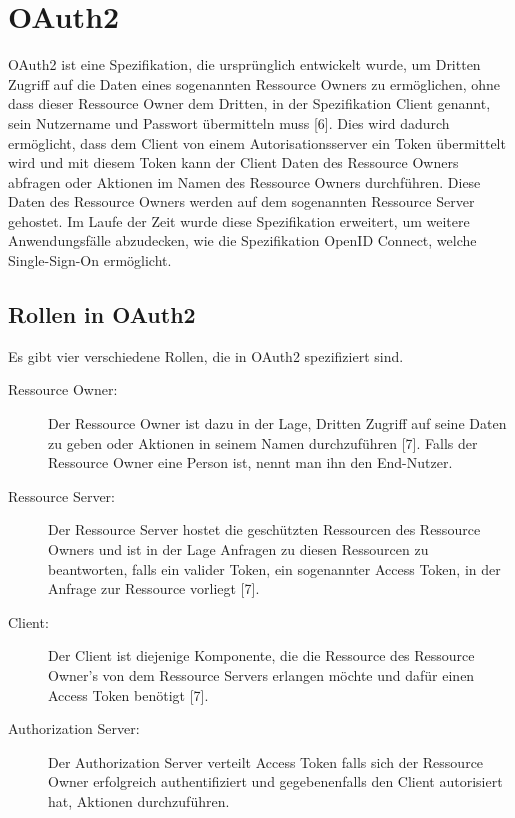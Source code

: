 %
%
\section{OAuth2}
\label{sec:background:second_section}
OAuth2 ist eine Spezifikation, die ursprünglich entwickelt wurde, um Dritten Zugriff auf die Daten eines sogenannten Ressource Owners zu ermöglichen, ohne dass dieser Ressource Owner dem Dritten, in der Spezifikation Client genannt, sein Nutzername und Passwort übermitteln muss [6].  Dies wird dadurch ermöglicht, dass dem Client von einem Autorisationsserver ein Token übermittelt wird und mit diesem Token kann der Client Daten des Ressource Owners abfragen oder Aktionen im Namen des Ressource Owners durchführen. Diese Daten des Ressource Owners werden auf dem sogenannten Ressource Server gehostet.
Im Laufe der Zeit wurde diese Spezifikation erweitert, um weitere Anwendungsfälle abzudecken, wie die Spezifikation OpenID Connect, welche Single-Sign-On ermöglicht. 

\subsection{Rollen in OAuth2}
\label{subsec:background:second_section:first_subsection}
Es gibt vier verschiedene Rollen, die in OAuth2 spezifiziert sind.

\begin{description}
  \item[Ressource Owner:] Der Ressource Owner ist dazu in der Lage, Dritten Zugriff auf seine Daten zu geben oder Aktionen in seinem Namen durchzuführen [7]. Falls der Ressource Owner eine Person ist, nennt man ihn den End-Nutzer.
  \item[Ressource Server:] Der Ressource Server hostet die geschützten Ressourcen des Ressource Owners und ist in der Lage Anfragen zu diesen Ressourcen zu beantworten, falls ein valider Token, ein sogenannter Access Token, in der Anfrage zur Ressource vorliegt [7].
  \item[Client:] Der Client ist diejenige Komponente, die die Ressource des Ressource Owner's von dem Ressource Servers erlangen möchte und dafür einen Access Token benötigt [7]. 
  \item[Authorization Server:] Der Authorization Server verteilt Access Token falls sich der Ressource Owner erfolgreich authentifiziert und gegebenenfalls den Client autorisiert hat, Aktionen durchzuführen. 
\end{description}

